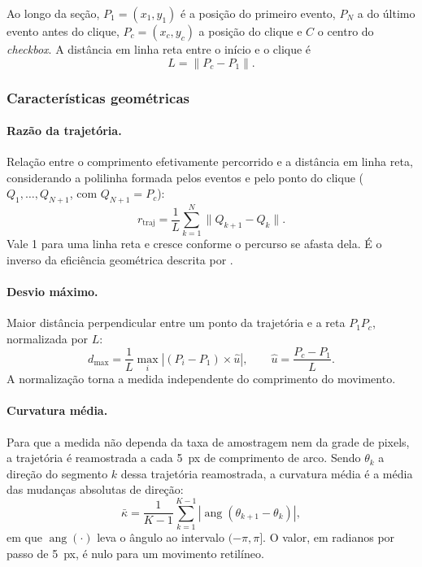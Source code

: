 Ao longo da seção, $P_1 = (x_1, y_1)$ é a posição do primeiro evento, $P_N$ a do último evento antes do clique, $P_c = (x_c, y_c)$ a posição do clique e $C$ o centro do \textit{checkbox}. A distância em linha reta entre o início e o clique é
\begin{equation}
    L = \lVert P_c - P_1 \rVert .
\end{equation}

\subsubsection{Características geométricas}

\paragraph{Razão da trajetória.} Relação entre o comprimento efetivamente percorrido e a distância em linha reta, considerando a polilinha formada pelos eventos e pelo ponto do clique ($Q_1, \dots, Q_{N+1}$, com $Q_{N+1} = P_c$):
\begin{equation}
    r_{\text{traj}} = \frac{1}{L} \sum_{k=1}^{N} \lVert Q_{k+1} - Q_k \rVert .
\end{equation}
Vale 1 para uma linha reta e cresce conforme o percurso se afasta dela. É o inverso da eficiência geométrica descrita por .

\paragraph{Desvio máximo.} Maior distância perpendicular entre um ponto da trajetória e a reta $P_1 P_c$, normalizada por $L$:
\begin{equation}
    d_{\max} = \frac{1}{L} \max_i \left| (P_i - P_1) \times \hat{u} \right| ,
    \qquad \hat{u} = \frac{P_c - P_1}{L} .
\end{equation}
A normalização torna a medida independente do comprimento do movimento.

\paragraph{Curvatura média.} Para que a medida não dependa da taxa de amostragem nem da grade de pixels, a trajetória é reamostrada a cada 5~px de comprimento de arco. Sendo $\theta_k$ a direção do segmento $k$ dessa trajetória reamostrada, a curvatura média é a média das mudanças absolutas de direção:
\begin{equation}
    \bar{\kappa} = \frac{1}{K-1} \sum_{k=1}^{K-1} \left| \operatorname{ang}(\theta_{k+1} - \theta_k) \right| ,
\end{equation}
em que $\operatorname{ang}(\cdot)$ leva o ângulo ao intervalo $(-\pi, \pi]$. O valor, em radianos por passo de 5~px, é nulo para um movimento retilíneo.

